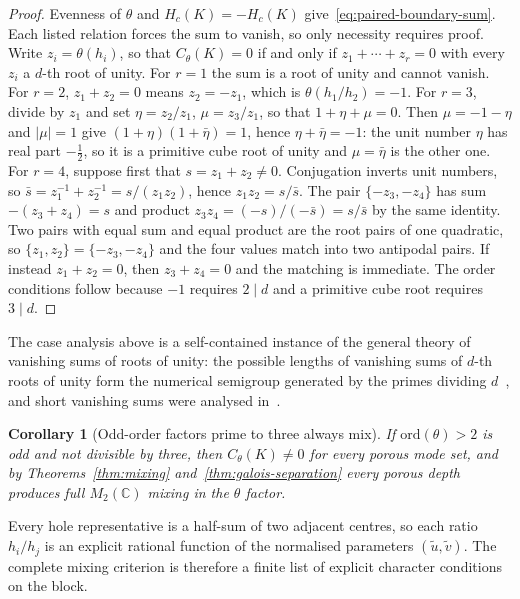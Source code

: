 \documentclass[11pt,a4paper]{article}
\newtheorem{corollary}[theorem]{Corollary}
\theoremstyle{definition}
\theoremstyle{remark}
\newcommand{\C}{\mathbb{C}}
\newcommand{\HK}{H_c(K)}
\begin{document}
\begin{proof}
  Evenness of $\theta$ and $\HK=-\HK$ give~\eqref{eq:paired-boundary-sum}.
  Each listed relation forces the sum to vanish, so only necessity requires proof.
  Write $z_i=\theta(h_i)$, so that $C_\theta(K)=0$ if and only if $z_1+\cdots+z_r=0$ with
  every $z_i$ a $d$-th root of unity.
  For $r=1$ the sum is a root of unity and cannot vanish.
  For $r=2$, $z_1+z_2=0$ means $z_2=-z_1$, which is $\theta(h_1/h_2)=-1$.
  For $r=3$, divide by $z_1$ and set $\eta=z_2/z_1$, $\mu=z_3/z_1$, so that $1+\eta+\mu=0$.
  Then $\mu=-1-\eta$ and $|\mu|=1$ give $(1+\eta)(1+\bar\eta)=1$, hence
  $\eta+\bar\eta=-1$: the unit number $\eta$ has real part $-\tfrac12$, so it is a
  primitive cube root of unity and $\mu=\bar\eta$ is the other one.
  For $r=4$, suppose first that $s=z_1+z_2\ne0$.
  Conjugation inverts unit numbers, so
  $\bar s=z_1^{-1}+z_2^{-1}=s/(z_1z_2)$, hence $z_1z_2=s/\bar s$.
  The pair $\{-z_3,-z_4\}$ has sum $-(z_3+z_4)=s$ and product
  $z_3z_4=(-s)/(-\bar s)=s/\bar s$ by the same identity.
  Two pairs with equal sum and equal product are the root pairs of one quadratic, so
  $\{z_1,z_2\}=\{-z_3,-z_4\}$ and the four values match into two antipodal pairs.
  If instead $z_1+z_2=0$, then $z_3+z_4=0$ and the matching is immediate.
  The order conditions follow because $-1$ requires $2\mid d$ and a primitive cube root
  requires $3\mid d$.
\end{proof}

The case analysis above is a self-contained instance of the general theory of vanishing
sums of roots of unity: the possible lengths of vanishing sums of $d$-th roots of unity
form the numerical semigroup generated by the primes dividing $d$~\cite{LamLeung2000}, and
short vanishing sums were analysed in~\cite{ConwayJones1976}.

\begin{corollary}[Odd-order factors prime to three always mix]
  \label{cor:odd-order-mixing}
  If $\mathrm{ord}(\theta)>2$ is odd and not divisible by three, then $C_\theta(K)\ne0$ for
  every porous mode set, and by Theorems~\ref{thm:mixing} and~\ref{thm:galois-separation}
  every porous depth produces full $M_2(\C)$ mixing in the $\theta$ factor.
\end{corollary}

Every hole representative is a half-sum of two adjacent centres, so each ratio $h_i/h_j$ is
an explicit rational function of the normalised parameters $(\widetilde u,\widetilde v)$.
The complete mixing criterion is therefore a finite list of explicit character conditions on
the block.
\end{document}
